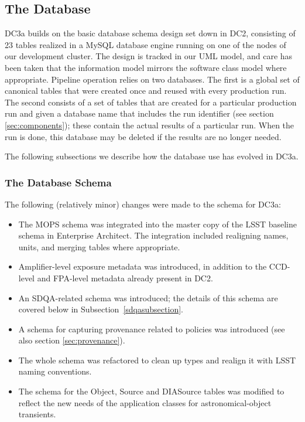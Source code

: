 
\subsection{The Database}

DC3a builds on the basic database schema design set down in DC2,
consisting of 23 tables realized in a MySQL database
engine running on one of the nodes of our development cluster.  The
design is tracked in our UML model, and care has been taken that the
information model mirrors the software class model where appropriate.
Pipeline operation relies on two databases.  The first is a global set of
canonical tables that were created once and reused with every production run.
The second consists of a set of tables that are created for a
particular production run and given a database name that includes
the run identifier (see section \ref{sec:components}); these contain
the actual results of a particular run.  When the run is done, this
database may be deleted if the results are no longer needed.  

The following subsections we describe how the database use has evolved
in DC3a.  

\subsubsection{The Database Schema}

The following (relatively minor) changes were made to the schema for DC3a:

\begin{itemize}

\item The MOPS schema was integrated into the master copy of the LSST
  baseline schema in Enterprise Architect.  The integration included
  realigning names, units, and merging tables where appropriate.

\item Amplifier-level exposure metadata was introduced, in addition to
  the CCD-level and FPA-level metadata already present in DC2.

\item An SDQA-related schema was introduced; the details of this
  schema are covered below in Subsection~\ref{sdqasubsection}.

\item A schema for capturing provenance related to policies was
  introduced (see also section \ref{sec:provenance}).

\item The whole schema was refactored to clean up types and realign it
  with LSST naming conventions. 

\item The schema for the Object, Source and DIASource tables was
  modified to reflect the new needs of the application classes for
  astronomical-object transients. 
\end{itemize}

